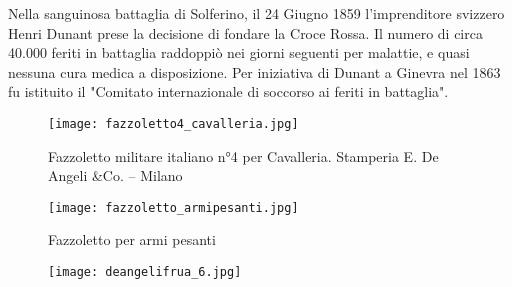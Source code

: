 \newpage

Nella sanguinosa battaglia di Solferino, il 24 Giugno 1859 l'imprenditore svizzero Henri Dunant prese la decisione di fondare la Croce Rossa. Il numero di circa 40.000 feriti in battaglia raddoppiò nei giorni seguenti per malattie, e quasi nessuna cura medica a disposizione. Per iniziativa di Dunant a Ginevra nel 1863 fu istituito il "Comitato internazionale di soccorso ai feriti in battaglia".

\begin{figure}[h]
	\centering
		\texttt{[image: fazzoletto4\_cavalleria.jpg]}
	\caption{Fazzoletto militare italiano n°4 per Cavalleria. Stamperia E. De Angeli \&Co. – Milano}
	\label{fig:fazzoletto4_cavalleria}
\end{figure}

\newpage

\begin{figure}[h]
	\centering
		\texttt{[image: fazzoletto\_armipesanti.jpg]}
	\caption{Fazzoletto per armi pesanti}
	\label{fig:fazzoletto_armipesanti}
\end{figure}

\newpage

\begin{figure}[h]
	\centering
		\texttt{[image: deangelifrua\_6.jpg]}
	\caption{}
	\label{fig:deangelifrua_6}
\end{figure}

\newpage

